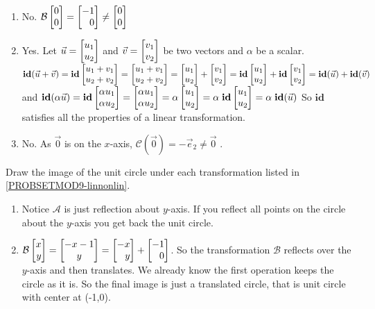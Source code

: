 \begin{exercises}
\begin{problist}
\begin{solution}
\begin{enumerate}
				\item No. $\mathcal{B}\mat{0\\0}= \mat{-1\\0}\neq \mat{0\\0}$

				\item Yes. Let $\vec{u}= \mat{u_1\\u_2}$ and $\vec{v}= \mat
					{v_1 \\ v_2}$ be two vectors and $\alpha$ be a scalar.
					$\mathbf{id}(\vec{u}+\vec{v}) = \mathbf{id}\mat
					{u_1 + v_1 \\ u_2 + v_2}= \mat{u_1 + v_1 \\ u_2 + v_2 }=
					\mat{u_1 \\ u_2 }+ \mat{ v_1 \\ v_2 }= \mathbf{id}\mat
					{u_1\\u_2}+ \mathbf{id}\mat{v_1 \\ v_2}= \mathbf{id}(\vec{u}
					) +\mathbf{id}(\vec{v})$
					and
					$\mathbf{id}(\alpha \vec{u}) =\mathbf{id}\mat
					{\alpha u_1 \\ \alpha u_2}= \mat{ \alpha u_1 \\ \alpha u_2}=
					\alpha \mat{ u_1 \\u_2}= \alpha \; \mathbf{id}\mat
					{ u_1 \\u_2}= \alpha \; \mathbf{id}(\vec{u}) $
					So $\mathbf{id}$ satisfies all the properties of a linear
					transformation.

				\item No. As $\vec{0}$ is on the $x$-axis,
					$\mathcal{C}(\vec{0}) = - \vec{e}_{2}\neq \vec{0}$ .
			\end{enumerate}
		\end{solution}

		\prob Draw the image of the unit circle under each transformation listed
		in \ref{PROBSETMOD9-linnonlin}.
		\begin{solution}
			\begin{enumerate}
				\item Notice $\mathcal{A}$ is just reflection about $y$-axis. If
					you reflect all points on the circle about the $y$-axis you get
					back the unit circle.

				\item
					$\mathcal{B}\mat{x\\y}= \matc{-x-1\\y}= \mat{-x\\y}+ \mat
					{-1\\0}$. So the transformation $\mathcal{B}$ reflects over
					the $y$-axis and then translates. We already know the first
					operation keeps the circle as it is. So the final image is just
					a translated circle, that is unit circle with center at (-1,0).


\end{enumerate}
\end{solution}
\end{problist}
\end{exercises}
